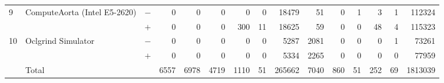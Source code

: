 \begin{tabular}{lll | rrrrrr | rrrrrr }
\hline
\multirow{ 2}{*}{9} & \multirow{ 2}{*}{ComputeAorta (Intel E5-2620)} & $-$ & 0 & 0 & 0 & 0 & 0 & 18479       & 51 & 0 & 1 & 3 & 1 & 112324 \\& & $+$ & 0 & 0 & 0 & 300 & 11 & 18625 & 59 & 0 & 0 & 48 & 4 & 115323 \\
\hline
\multirow{ 2}{*}{10} & \multirow{ 2}{*}{Oclgrind Simulator} & $-$ & 0 & 0 & 0 & 0 & 0 & 5287       & 2081 & 0 & 0 & 0 & 1 & 73261 \\& & $+$ & 0 & 0 & 0 & 0 & 0 & 5334 & 2265 & 0 & 0 & 0 & 0 & 77959 \\
  \midrule
  
\multirow{ 2}{*}{} & \multirow{ 2}{*}{Total} & \multirow{ 2}{*}{} &
\multirow{ 2}{*}{6557} & \multirow{ 2}{*}{6978} & \multirow{ 2}{*}{4719} & \multirow{ 2}{*}{1110} & \multirow{ 2}{*}{51} & \multirow{ 2}{*}{265662} & \multirow{ 2}{*}{7040} & \multirow{ 2}{*}{860} & \multirow{ 2}{*}{51} & \multirow{ 2}{*}{252} & \multirow{ 2}{*}{69} & \multirow{ 2}{*}{1813039} \\
\\

  \bottomrule
\end{tabular}

